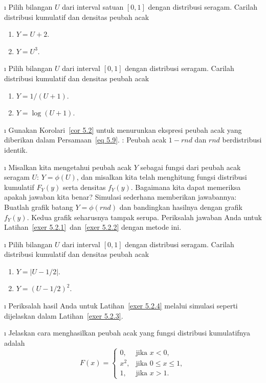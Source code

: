 \exercises
\begin{LJSItem}

\i\label{exer 5.2.1} Pilih bilangan $U$ dari interval satuan $[0,1]$ dengan
distribusi seragam.  Carilah distribusi kumulatif dan densitas peubah acak
\begin{enumerate}
\item $Y = U + 2$.

\item $Y = U^3$.
\end{enumerate}

\i\label{exer 5.2.2} Pilih bilangan $U$ dari interval $[0,1]$ dengan distribusi
seragam.  Carilah distribusi kumulatif dan densitas peubah acak
\begin{enumerate}
\item $Y = 1/(U + 1)$.

\item $Y = \log(U + 1)$.
\end{enumerate}

\i\label{exer 5.2.2.5} Gunakan Korolari~\ref{cor 5.2} untuk menurunkan ekspresi
peubah acak yang diberikan dalam Persamaan~\ref{eq 5.9}.   : Peubah
acak $1 - rnd$ dan $rnd$ berdistribusi identik.


\i\label{exer 5.2.3} Misalkan kita mengetahui peubah acak $Y$ sebagai fungsi dari
peubah acak seragam $U$: $Y = \phi(U)$, dan misalkan kita telah menghitung fungsi
distribusi kumulatif $F_Y(y)$ serta densitas $f_Y(y)$.  Bagaimana kita dapat memeriksa
apakah jawaban kita benar?  Simulasi sederhana memberikan jawabannya: Buatlah grafik
batang $Y = \phi(\mbox{$rnd$})$ dan bandingkan hasilnya dengan grafik $f_Y(y)$.
Kedua grafik seharusnya tampak serupa.  Periksalah jawaban Anda untuk
Latihan~\ref{exer 5.2.1}~dan~\ref{exer 5.2.2} dengan metode ini.

\i\label{exer 5.2.4} Pilih bilangan $U$ dari interval $[0,1]$ dengan distribusi
seragam.  Carilah distribusi kumulatif dan densitas peubah acak
\begin{enumerate}
\item $Y = |U - 1/2|$.

\item $Y = (U - 1/2)^2$.
\end{enumerate}

\i\label{exer 5.2.5} Periksalah hasil Anda untuk Latihan~\ref{exer 5.2.4} melalui
simulasi seperti dijelaskan dalam Latihan~\ref{exer 5.2.3}.

\i\label{exer 5.2.6} Jelaskan cara menghasilkan peubah acak yang fungsi distribusi
kumulatifnya adalah
$$ F(x) =  \left \{ \begin{array}{ll}
              0, & \mbox{jika $x < 0$}, \\
            x^2, & \mbox{jika $0 \leq x \leq 1$}, \\
              1, & \mbox{jika $x > 1.$}
                 \end{array}
        \right.
$$


\end{LJSItem}
